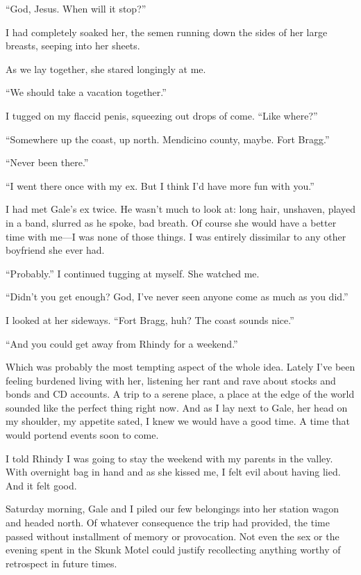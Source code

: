``God, Jesus. When will it stop?''

I had completely soaked her, the semen running down the sides of her
large breasts, seeping into her sheets.

As we lay together, she stared longingly at me.

``We should take a vacation together.''

I tugged on my flaccid penis, squeezing out drops of come. ``Like
where?''

``Somewhere up the coast, up north. Mendicino county, maybe. Fort
Bragg.''

``Never been there.''

``I went there once with my ex. But I think I'd have more fun with
you.''

I had met Gale's ex twice. He wasn't much to look at: long hair,
unshaven, played in a band, slurred as he spoke, bad breath. Of course
she would have a better time with me---I was none of those things. I was
entirely dissimilar to any other boyfriend she ever had.

``Probably.'' I continued tugging at myself. She watched me.

``Didn't you get enough? God, I've never seen anyone come as much as you
did.''

I looked at her sideways. ``Fort Bragg, huh? The coast sounds nice.''

``And you could get away from Rhindy for a weekend.''

Which was probably the most tempting aspect of the whole idea. Lately
I've been feeling burdened living with her, listening her rant and rave
about stocks and bonds and CD accounts. A trip to a serene place, a
place at the edge of the world sounded like the perfect thing right now.
And as I lay next to Gale, her head on my shoulder, my appetite sated, I
knew we would have a good time. A time that would portend events soon to
come.

I told Rhindy I was going to stay the weekend with my parents in the
valley. With overnight bag in hand and as she kissed me, I felt evil
about having lied. And it felt good.

Saturday morning, Gale and I piled our few belongings into her station
wagon and headed north. Of whatever consequence the trip had provided,
the time passed without installment of memory or provocation. Not even
the sex or the evening spent in the Skunk Motel could justify
recollecting anything worthy of retrospect in future times.

